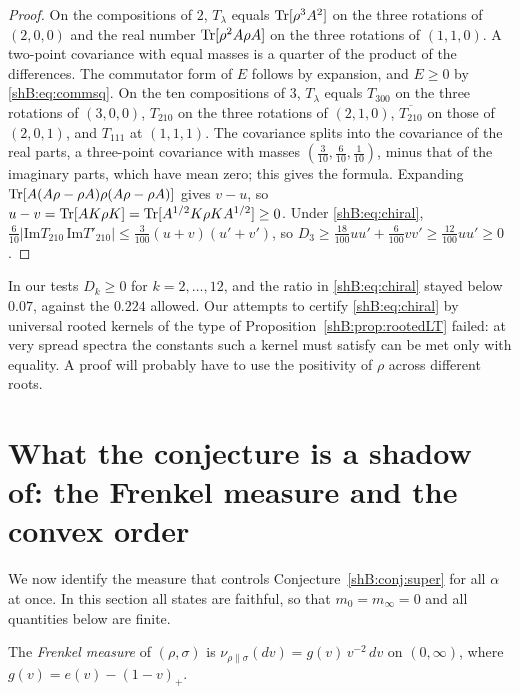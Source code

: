 \begin{proof}
On the compositions of $2$, $T_\lambda$ equals $\operatorname{Tr}[\rho^3A^2]$ on the three rotations of $(2,0,0)$ and the real number $\operatorname{Tr}[\rho^2A\rho A]$ on the three rotations of $(1,1,0)$. A two-point covariance with equal masses is a quarter of the product of the differences. The commutator form of $E$ follows by expansion, and $E\ge0$ by \eqref{shB:eq:commsq}. On the ten compositions of $3$, $T_\lambda$ equals $T_{300}$ on the three rotations of $(3,0,0)$, $T_{210}$ on the three rotations of $(2,1,0)$, $\overline{T_{210}}$ on those of $(2,0,1)$, and $T_{111}$ at $(1,1,1)$. The covariance splits into the covariance of the real parts, a three-point covariance with masses $(\frac3{10},\frac6{10},\frac1{10})$, minus that of the imaginary parts, which have mean zero; this gives the formula. Expanding $\operatorname{Tr}[A(A\rho-\rho A)\rho(A\rho-\rho A)]$ gives $v-u$, so $u-v=\operatorname{Tr}[AK\rho K]=\operatorname{Tr}[A^{1/2}K\rho KA^{1/2}]\ge0$. Under \eqref{shB:eq:chiral}, $\frac6{10}|\mathrm{Im}T_{210}\,\mathrm{Im}T'_{210}|\le\frac3{100}(u+v)(u'+v')$, so $D_3\ge\frac{18}{100}uu'+\frac6{100}vv'\ge\frac{12}{100}uu'\ge0$.
\end{proof}

In our tests $D_k\ge0$ for $k=2,\dots,12$, and the ratio in \eqref{shB:eq:chiral} stayed below $0.07$, against the $0.224$ allowed. Our attempts to certify \eqref{shB:eq:chiral} by universal rooted kernels of the type of Proposition~\ref{shB:prop:rootedLT} failed: at very spread spectra the constants such a kernel must satisfy can be met only with equality. A proof will probably have to use the positivity of $\rho$ across different roots.

\section{What the conjecture is a shadow of: the Frenkel measure and the convex order}\label{shB:sec:frenkel}

We now identify the measure that controls Conjecture~\ref{shB:conj:super} for all $\alpha$ at once. In this section all states are faithful, so that $m_0=m_\infty=0$ and all quantities below are finite.

\begin{definition}\label{shB:def:frenkel}
The \emph{Frenkel measure} of $(\rho,\sigma)$ is $\nu_{\rho\|\sigma}(dv)=g(v)\,v^{-2}\,dv$ on $(0,\infty)$, where $g(v)=e(v)-(1-v)_+$.
\end{definition}

